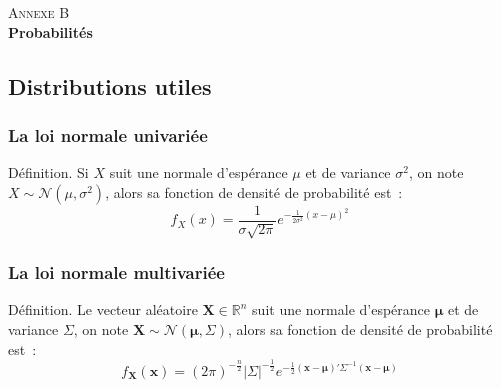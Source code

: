 \documentclass[10pt]{beamer}
\theoremstyle{plain}
\newenvironment{defn}[1]
{\bgroup \small\begin{block}{Définition. #1}}
  {\end{block}\egroup}
\begin{document}
\begin{frame}
  \begin{center}
    \Huge{\textsc{Annexe B}}\\
    \Huge\textbf{Probabilités}
  \end{center}
\end{frame}

\subsection{Distributions utiles}

\begin{frame}
  \frametitle{La loi normale univariée}

  \begin{defn}{}
    Si $X$ suit une normale d'espérance $\mu$ et de variance $\sigma^2$, on note $X\sim\mathcal N \left(\mu, \sigma^2\right)$, alors sa fonction de densité de probabilité est~:
    \[
      f_X(x) = \frac{1}{\sigma\sqrt{2\pi}}e^{-\frac{1}{2\sigma^2}\left(x-\mu\right)^2}
    \]
  \end{defn}

\end{frame}

\begin{frame}
  \frametitle{La loi normale multivariée}

  \begin{defn}{}
    Le vecteur aléatoire $\bm{X}\in \mathbb R^n$ suit une normale d'espérance $\bm \mu$ et de variance $\Sigma$, on note $\bm{X}\sim\mathcal N \left(\bm\mu, \Sigma\right)$, alors sa fonction de densité de probabilité est~:
    \[
      f_{\bm X}(\bm x) = \left( 2\pi \right)^{-\frac{n}{2}}\left| \Sigma \right|^{-\frac{1}{2}}e^{-\frac{1}{2}\left(\bm x-\bm\mu\right)'\Sigma^{-1}\left(\bm x-\bm\mu\right)}
    \]
  \end{defn}

\end{frame}
\end{document}
